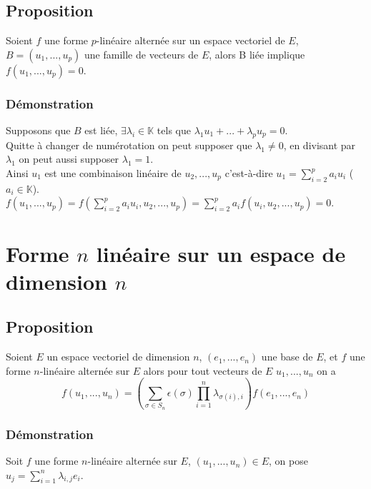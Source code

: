 \documentclass[a4paper,10pt]{book} %
\newcommand{\K}{\mathbb{K}}
\newcommand{\ev}{espace vectoriel }
\begin{document}
\subsection{Proposition}
Soient $f$ une forme $p$-linéaire alternée sur un \ev de $E$, $B=(u_1,...,u_p)$ une famille de vecteurs de $E$, alors B liée implique $f(u_1,...,u_p)=0$.

\subsubsection{Démonstration}
Supposons que $B$ est liée, $\exists \lambda_i \in \K$ tels que $\lambda_1u_1+...+\lambda_pu_p=0$.\\

Quitte à changer de numérotation on peut supposer que $\lambda_1\neq 0$, en divisant par $\lambda_1$ on peut aussi supposer $\lambda_1=1$.\\

Ainsi $u_1$ est une combinaison linéaire de $u_2,...,u_p$ c'est-à-dire $u_1=\sum\limits_{i=2}^p a_iu_i$ ($a_i\in \K$).\\
$f(u_1,...,u_p)=f(\sum\limits_{i=2}^p a_iu_i,u_2,...,u_p)=\sum\limits_{i=2}^p a_if(u_i,u_2,...,u_p)=0$.

\section{Forme $n$ linéaire sur un espace de dimension $n$}
\subsection{Proposition}
Soient $E$ un \ev de dimension $n$, $(e_1,...,e_n)$ une base de $E$, et $f$ une forme $n$-linéaire alternée sur $E$ alors pour tout vecteurs de $E$  $u_1,...,u_n$ on a
$$f(u_1,...,u_n)=(\sum_{\sigma\in S_n}\epsilon(\sigma)\prod_{i=1}^n\lambda_{\sigma(i),i})f(e_1,...,e_n)$$

\subsubsection{Démonstration}
Soit $f$ une forme $n$-linéaire alternée sur $E$, $(u_1,...,u_n)\in E$, on pose $u_j=\sum\limits_{i=1}^n\lambda_{i,j}e_i$.\\
\end{document}
